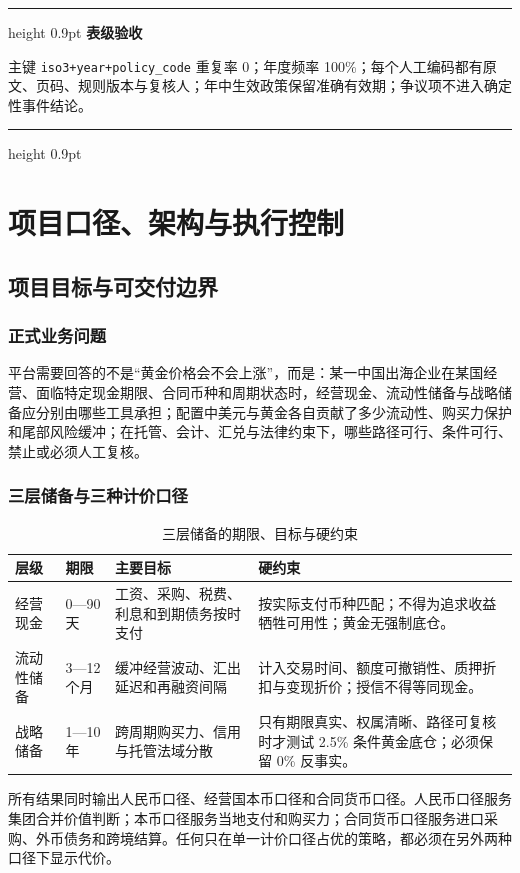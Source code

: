 \documentclass[UTF8,fontset=windows,12pt,openany]{ctexbook}
\newenvironment{gatebox}[1][]{%
  \par\medskip\noindent\begin{center}\begin{minipage}{0.93\textwidth}%
  \color{GoldLine}\hrule height 0.9pt\vspace{0.45em}%
  \textbf{#1}\par\smallskip\color{black}%
}{%
  \par\vspace{0.35em}\color{GoldLine}\hrule height 0.9pt%
  \end{minipage}\end{center}\medskip%
}
\newcommand{\Field}[1]{{\small\nolinkurl{#1}}}
\begin{document}
\begin{gatebox}[表级验收]
主键 \Field{iso3+year+policy_code} 重复率 0；年度频率 100\%；每个人工编码都有原文、页码、规则版本与复核人；年中生效政策保留准确有效期；争议项不进入确定性事件结论。
\end{gatebox}


\part{项目口径、架构与执行控制}

\chapter{项目目标与可交付边界}

\section{正式业务问题}

平台需要回答的不是“黄金价格会不会上涨”，而是：某一中国出海企业在某国经营、面临特定现金期限、合同币种和周期状态时，经营现金、流动性储备与战略储备应分别由哪些工具承担；配置中美元与黄金各自贡献了多少流动性、购买力保护和尾部风险缓冲；在托管、会计、汇兑与法律约束下，哪些路径可行、条件可行、禁止或必须人工复核。

\section{三层储备与三种计价口径}

\begin{longtable}{p{2.8cm}p{2.8cm}p{4.0cm}p{4.3cm}}
\caption{三层储备的期限、目标与硬约束}\label{tab:three-layers}\\
\toprule
\textbf{层级} & \textbf{期限} & \textbf{主要目标} & \textbf{硬约束}\\
\midrule
经营现金 & 0—90 天 & 工资、采购、税费、利息和到期债务按时支付 & 按实际支付币种匹配；不得为追求收益牺牲可用性；黄金无强制底仓。\\
流动性储备 & 3—12 个月 & 缓冲经营波动、汇出延迟和再融资间隔 & 计入交易时间、额度可撤销性、质押折扣与变现折价；授信不得等同现金。\\
战略储备 & 1—10 年 & 跨周期购买力、信用与托管法域分散 & 只有期限真实、权属清晰、路径可复核时才测试 2.5\% 条件黄金底仓；必须保留 0\% 反事实。\\
\bottomrule
\end{longtable}

所有结果同时输出人民币口径、经营国本币口径和合同货币口径。人民币口径服务集团合并价值判断；本币口径服务当地支付和购买力；合同货币口径服务进口采购、外币债务和跨境结算。任何只在单一计价口径占优的策略，都必须在另外两种口径下显示代价。
\end{document}
